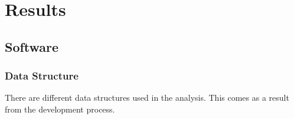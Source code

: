 \chapter{Results}

\section{Software}
\subsection{Data Structure}
There are different data structures used in the analysis. This comes as a result from the development process.

